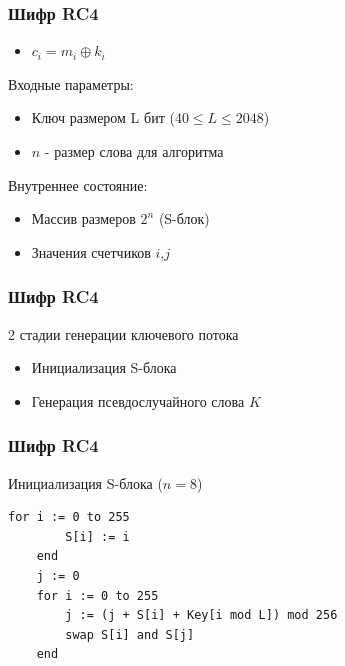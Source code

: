 \documentclass{beamer}
\begin{document}
\begin{frame}
  \frametitle{Шифр RC4}

  \begin{itemize}
    \item{$c_{i} = m_{i} \oplus k_{i}$}
  \end{itemize}

  \begin{block}{Входные параметры:}
    \begin{itemize}
      \item{Ключ размером L бит ($40 \le L \le 2048$)}
      \item{$n$ - размер слова для алгоритма}
    \end{itemize}
  \end{block}

  \begin{block}{Внутреннее состояние:}
    \begin{itemize}
      \item{Массив размеров $2^n$ (S-блок)}
      \item{Значения счетчиков $i$,$j$}
    \end{itemize}
  \end{block}
\end{frame}

\begin{frame}
  \frametitle{Шифр RC4}

  \begin{block}{2 стадии генерации ключевого потока}
    \begin{itemize}
      \item{Инициализация S-блока}
      \item{Генерация псевдослучайного слова $K$}
    \end{itemize}
  \end{block}
\end{frame}

\begin{frame}[fragile]
  \frametitle{Шифр RC4}

  \begin{block}{Инициализация S-блока ($n = 8$)}
    \lstset{language=Pascal}
    \begin{lstlisting}[frame=single]
    for i := 0 to 255
        S[i] := i
    end
    j := 0
    for i := 0 to 255
        j := (j + S[i] + Key[i mod L]) mod 256
        swap S[i] and S[j]
    end
    \end{lstlisting}
  \end{block}
\end{frame}
\end{document}
